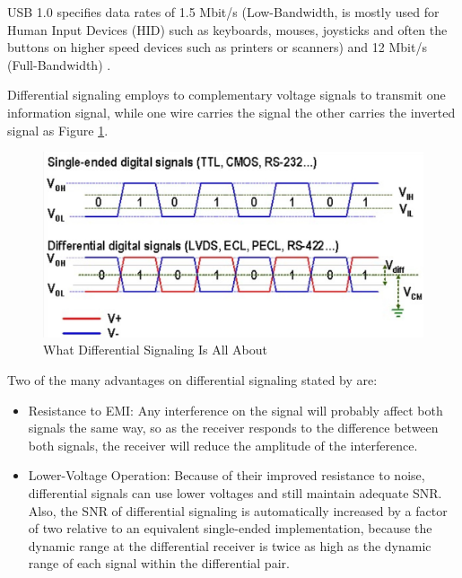 		USB 1.0 specifies data rates of 1.5 Mbit/s (Low-Bandwidth, is mostly used for Human Input Devices (HID) such as keyboards, mouses, joysticks and often the buttons on higher speed devices such as printers or scanners) and 12 Mbit/s (Full-Bandwidth) \cite{specification91}.
		\par
		Differential signaling employs to complementary voltage signals to transmit one information signal, while one wire carries the signal the other carries the inverted signal \cite{diffkinnaird} as Figure \ref{fig:diff-signaling}.

			\begin{figure}[htbp]
				\centering
					\includegraphics[scale=0.8]{figuras/fig-diff-signaling}
				\caption{What Differential Signaling Is All About \cite{diff-signaling-autodesk}}
				\label{fig:diff-signaling}
			\end{figure}

		Two of the many advantages on differential signaling stated by \cite{pinkle2016dif} are:

		\begin{itemize}
			\item Resistance to EMI: Any interference on the signal will probably affect both signals the same way, so as the receiver responds to the difference between both signals, the receiver will reduce the amplitude of the interference.\label{itm:diff-signaling-emi}
			\item Lower-Voltage Operation: Because of their improved resistance to noise, differential signals can use lower voltages and still maintain adequate SNR. Also, the SNR of differential signaling is automatically increased by a factor of two relative to an equivalent single-ended implementation, because the dynamic range at the differential receiver is twice as high as the dynamic range of each signal within the differential pair.\label{itm:diff-signaling-low-voltage}
		\end{itemize}

